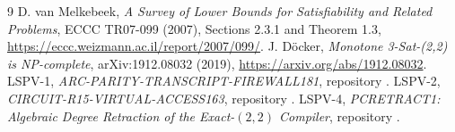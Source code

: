 \documentclass[11pt]{article}
\begin{document}
\begin{thebibliography}{9}
 D. van Melkebeek, \emph{A Survey of Lower Bounds for Satisfiability and Related Problems}, ECCC TR07-099 (2007), Sections 2.3.1 and Theorem 1.3, \url{https://eccc.weizmann.ac.il/report/2007/099/}.
 J. D\"ocker, \emph{Monotone 3-Sat-(2,2) is NP-complete}, arXiv:1912.08032 (2019), \url{https://arxiv.org/abs/1912.08032}.
 LSPV-1, \emph{ARC-PARITY-TRANSCRIPT-FIREWALL181}, repository .
 LSPV-2, \emph{CIRCUIT-R15-VIRTUAL-ACCESS163}, repository .
 LSPV-4, \emph{PCRETRACT1: Algebraic Degree Retraction of the Exact-$(2,2)$ Compiler}, repository .
\end{thebibliography}
\end{document}

